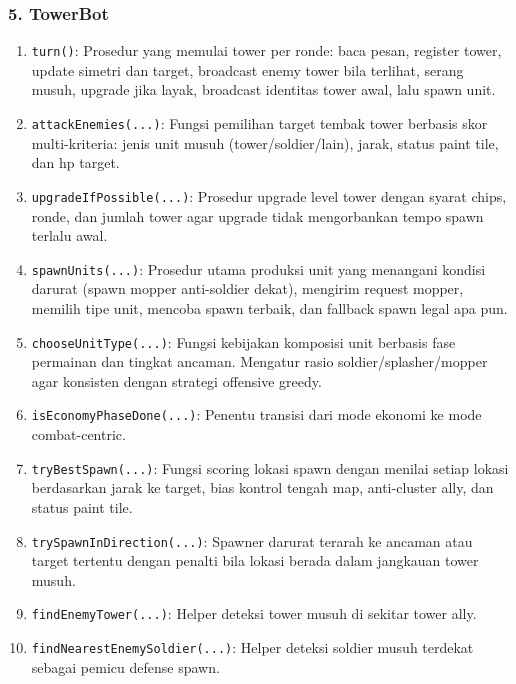 \subsubsection{5. TowerBot}
\begin{enumerate}
	\item \texttt{turn()}:
	      Prosedur yang memulai tower per ronde: baca pesan, register tower, update simetri dan target, broadcast enemy tower bila terlihat, serang musuh, upgrade jika layak, broadcast identitas tower awal, lalu spawn unit.

	\item \texttt{attackEnemies(...)}:
	      Fungsi pemilihan target tembak tower berbasis skor multi-kriteria: jenis unit musuh (tower/soldier/lain), jarak, status paint tile, dan hp target.

	\item \texttt{upgradeIfPossible(...)}:
	      Prosedur upgrade level tower dengan syarat chips, ronde, dan jumlah tower agar upgrade tidak mengorbankan tempo spawn terlalu awal.

	\item \texttt{spawnUnits(...)}:
	      Prosedur utama produksi unit yang menangani kondisi darurat (spawn mopper anti-soldier dekat), mengirim request mopper, memilih tipe unit, mencoba spawn terbaik, dan fallback spawn legal apa pun.

	\item \texttt{chooseUnitType(...)}:
	      Fungsi kebijakan komposisi unit berbasis fase permainan dan tingkat ancaman. Mengatur rasio soldier/splasher/mopper agar konsisten dengan strategi offensive greedy.

	\item \texttt{isEconomyPhaseDone(...)}:
	      Penentu transisi dari mode ekonomi ke mode combat-centric.

	\item \texttt{tryBestSpawn(...)}:
	      Fungsi scoring lokasi spawn dengan menilai setiap lokasi berdasarkan jarak ke target, bias kontrol tengah map, anti-cluster ally, dan status paint tile.

	\item \texttt{trySpawnInDirection(...)}:
	      Spawner darurat terarah ke ancaman atau target tertentu dengan penalti bila lokasi berada dalam jangkauan tower musuh.

	\item \texttt{findEnemyTower(...)}:
	      Helper deteksi tower musuh di sekitar tower ally.

	\item \texttt{findNearestEnemySoldier(...)}:
	      Helper deteksi soldier musuh terdekat sebagai pemicu defense spawn.


\end{enumerate}
